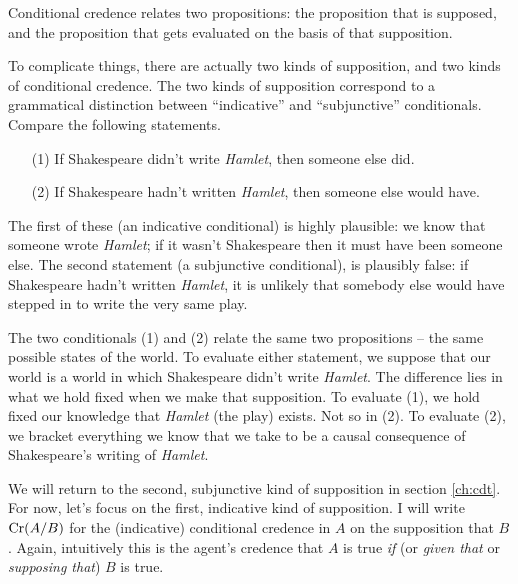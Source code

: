 Conditional credence relates two propositions: the proposition that is supposed,
and the proposition that gets evaluated on the basis of that supposition.

To complicate things, there are actually two kinds of supposition, and two kinds
of conditional credence. The two kinds of supposition correspond to a
grammatical distinction between ``indicative'' and ``subjunctive'' conditionals.
Compare the following statements.
%
\begin{itemize}[itemsep=0.5pt]
\item[(1)] If Shakespeare didn't write \emph{Hamlet}, then someone else did.
\item[(2)] If Shakespeare hadn't written \emph{Hamlet}, then someone else
  would have.
\end{itemize}
%
The first of these (an indicative conditional) is highly plausible: we know that
someone wrote \emph{Hamlet}; if it wasn't Shakespeare then it must have been
someone else. The second statement (a subjunctive conditional), is plausibly
false: if Shakespeare hadn't written \emph{Hamlet}, it is unlikely that somebody
else would have stepped in to write the very same play.

The two conditionals (1) and (2) relate the same two propositions -- the same
possible states of the world. To evaluate either statement, we suppose that our
world is a world in which Shakespeare didn't write \emph{Hamlet}. The difference
lies in what we hold fixed when we make that supposition. To evaluate (1), we
hold fixed our knowledge that \emph{Hamlet} (the play) exists. Not so in (2). To
evaluate (2), we bracket everything we know that we take to be a causal
consequence of Shakespeare's writing of \emph{Hamlet}.


We will return to the second, subjunctive kind of supposition in section
\ref{ch:cdt}. For now, let's focus on the first, indicative kind of supposition.
I will write $\text{Cr}(A/B)$ for the (indicative) conditional credence in
$A$ on the supposition that $B$. Again, intuitively this is the agent's credence
that $A$ is true \emph{if} (or \emph{given that} or \emph{supposing that}) $B$
is true.

